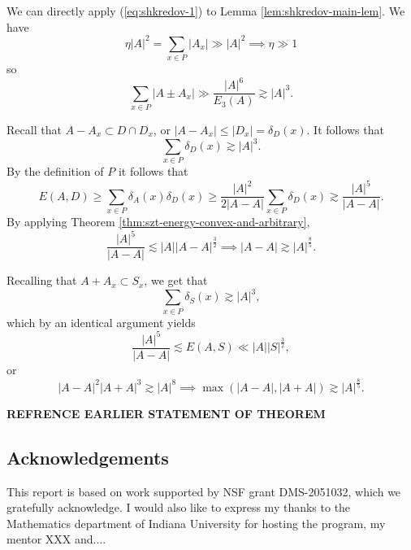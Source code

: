 \documentclass[12pt,reqno]{amsart}
\begin{document}
We can directly apply (\ref{eq:shkredov-1}) to Lemma \ref{lem:shkredov-main-lem}. We have
\[
    \eta \left\lvert A \right\rvert ^{2} = \sum _{x \in P} \left\lvert A_{x}  \right\rvert \gg \left\lvert A \right\rvert ^{2} \implies \eta \gg 1
\]
so
\[
    \sum _{x \in P} \left\lvert A \pm  A_{x}  \right\rvert \gg \frac{\left\lvert A \right\rvert ^{6}}{E_{3} (A)} \gtrsim \left\lvert A \right\rvert ^{3}
.\]

Recall that \(A - A_{x} \subset D \cap D_{x} \), or \(\left\lvert A - A_{x}  \right\rvert \leq \left\lvert D_{x}  \right\rvert = \delta_{D} (x)\). It follows that
\[
    \sum _{x \in P} \delta_{D} (x) \gtrsim \left\lvert A \right\rvert ^{3}
.\]
By the definition of \(P\) it follows that
\[
    E(A,D) \geq \sum _{x \in P} \delta_{A} (x)\delta_{D} (x) \geq \frac{\left\lvert A \right\rvert ^{2}}{2 \left\lvert A-A \right\rvert } \sum _{x \in P} \delta_{D} (x) \gtrsim \frac{\left\lvert A \right\rvert ^{5}}{\left\lvert A-A \right\rvert }
.\]
By applying Theorem \ref{thm:szt-energy-convex-and-arbitrary},
\[
    \frac{\left\lvert A \right\rvert ^{5}}{\left\lvert A-A \right\rvert } \lesssim \left\lvert A \right\rvert \left\lvert A-A \right\rvert ^{\frac{3}{2} } \implies \left\lvert A-A \right\rvert \gtrsim \left\lvert A \right\rvert ^{\frac{8}{5} }
.\]

Recalling that \(A + A_{x} \subset S_{x} \), we get that
\[
    \sum _{x \in P} \delta_{S} (x) \gtrsim \left\lvert A \right\rvert ^{3} 
,\]
which by an identical argument yields
\[
    \frac{\left\lvert A \right\rvert ^{5} }{\left\lvert A-A \right\rvert } \lesssim E(A,S) \ll \left\lvert A \right\rvert \left\lvert S \right\rvert ^{\frac{3}{2} }
,\]
or
\[
    \left\lvert A-A \right\rvert ^{2} \left\lvert A+A \right\rvert ^{3} \gtrsim \left\lvert A \right\rvert ^{8} \implies \max \left( \left\lvert A-A \right\rvert , \left\lvert A+A \right\rvert  \right) \gtrsim \left\lvert A \right\rvert^{\frac{8}{5} }
.\]

\textbf{REFRENCE EARLIER STATEMENT OF THEOREM}

\subsection*{Acknowledgements} %
This report is based on work supported by NSF grant DMS-2051032, which we gratefully acknowledge. I would also like to express my thanks to the Mathematics department of Indiana University for hosting the program, my mentor XXX and....
\end{document}
